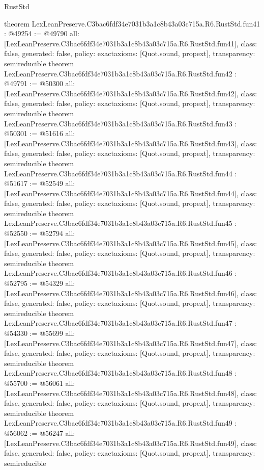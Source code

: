 \begin{lexlean}{RustStd}
\begin{coremodule}
{}
theorem LexLeanPreserve.C3bac6fdf34e7031b3a1c8b43a03c715a.R6.RustStd.fun41 : @49254 := @49790 {
  all: [LexLeanPreserve.C3bac6fdf34e7031b3a1c8b43a03c715a.R6.RustStd.fun41],
  class: false,
  generated: false,
  policy: exact{axioms: [Quot.sound, propext]},
  transparency: semireducible
}
theorem LexLeanPreserve.C3bac6fdf34e7031b3a1c8b43a03c715a.R6.RustStd.fun42 : @49791 := @50300 {
  all: [LexLeanPreserve.C3bac6fdf34e7031b3a1c8b43a03c715a.R6.RustStd.fun42],
  class: false,
  generated: false,
  policy: exact{axioms: [Quot.sound, propext]},
  transparency: semireducible
}
theorem LexLeanPreserve.C3bac6fdf34e7031b3a1c8b43a03c715a.R6.RustStd.fun43 : @50301 := @51616 {
  all: [LexLeanPreserve.C3bac6fdf34e7031b3a1c8b43a03c715a.R6.RustStd.fun43],
  class: false,
  generated: false,
  policy: exact{axioms: [Quot.sound, propext]},
  transparency: semireducible
}
theorem LexLeanPreserve.C3bac6fdf34e7031b3a1c8b43a03c715a.R6.RustStd.fun44 : @51617 := @52549 {
  all: [LexLeanPreserve.C3bac6fdf34e7031b3a1c8b43a03c715a.R6.RustStd.fun44],
  class: false,
  generated: false,
  policy: exact{axioms: [Quot.sound, propext]},
  transparency: semireducible
}
theorem LexLeanPreserve.C3bac6fdf34e7031b3a1c8b43a03c715a.R6.RustStd.fun45 : @52550 := @52794 {
  all: [LexLeanPreserve.C3bac6fdf34e7031b3a1c8b43a03c715a.R6.RustStd.fun45],
  class: false,
  generated: false,
  policy: exact{axioms: [Quot.sound, propext]},
  transparency: semireducible
}
theorem LexLeanPreserve.C3bac6fdf34e7031b3a1c8b43a03c715a.R6.RustStd.fun46 : @52795 := @54329 {
  all: [LexLeanPreserve.C3bac6fdf34e7031b3a1c8b43a03c715a.R6.RustStd.fun46],
  class: false,
  generated: false,
  policy: exact{axioms: [Quot.sound, propext]},
  transparency: semireducible
}
theorem LexLeanPreserve.C3bac6fdf34e7031b3a1c8b43a03c715a.R6.RustStd.fun47 : @54330 := @55699 {
  all: [LexLeanPreserve.C3bac6fdf34e7031b3a1c8b43a03c715a.R6.RustStd.fun47],
  class: false,
  generated: false,
  policy: exact{axioms: [Quot.sound, propext]},
  transparency: semireducible
}
theorem LexLeanPreserve.C3bac6fdf34e7031b3a1c8b43a03c715a.R6.RustStd.fun48 : @55700 := @56061 {
  all: [LexLeanPreserve.C3bac6fdf34e7031b3a1c8b43a03c715a.R6.RustStd.fun48],
  class: false,
  generated: false,
  policy: exact{axioms: [Quot.sound, propext]},
  transparency: semireducible
}
theorem LexLeanPreserve.C3bac6fdf34e7031b3a1c8b43a03c715a.R6.RustStd.fun49 : @56062 := @56247 {
  all: [LexLeanPreserve.C3bac6fdf34e7031b3a1c8b43a03c715a.R6.RustStd.fun49],
  class: false,
  generated: false,
  policy: exact{axioms: [Quot.sound, propext]},
  transparency: semireducible
}
\end{coremodule}
\end{lexlean}
